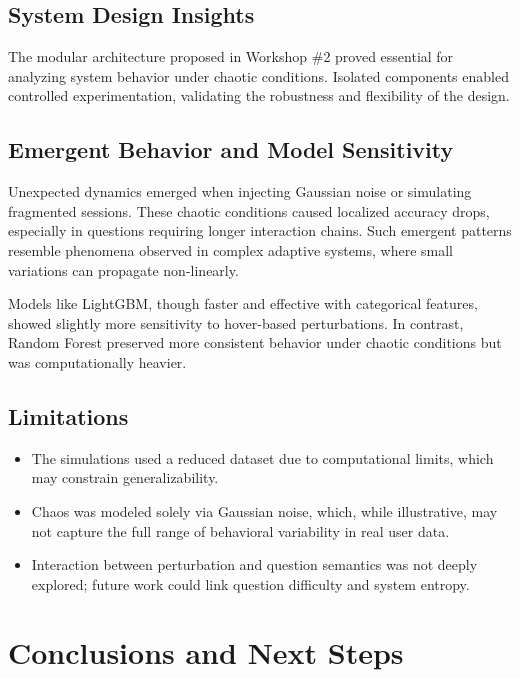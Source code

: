 \documentclass[12pt]{article}
\begin{document}
\subsection{System Design Insights}

The modular architecture proposed in Workshop \#2 proved essential for analyzing system behavior under chaotic conditions. Isolated components enabled controlled experimentation, validating the robustness and flexibility of the design.

\subsection{Emergent Behavior and Model Sensitivity}

Unexpected dynamics emerged when injecting Gaussian noise or simulating fragmented sessions. These chaotic conditions caused localized accuracy drops, especially in questions requiring longer interaction chains. Such emergent patterns resemble phenomena observed in complex adaptive systems, where small variations can propagate non-linearly.

Models like LightGBM, though faster and effective with categorical features, showed slightly more sensitivity to hover-based perturbations. In contrast, Random Forest preserved more consistent behavior under chaotic conditions but was computationally heavier.

\subsection{Limitations}

\begin{itemize}
	\item The simulations used a reduced dataset due to computational limits, which may constrain generalizability.
	\item Chaos was modeled solely via Gaussian noise, which, while illustrative, may not capture the full range of behavioral variability in real user data.
	\item Interaction between perturbation and question semantics was not deeply explored; future work could link question difficulty and system entropy.
\end{itemize}
	
\section{Conclusions and Next Steps}
\end{document}
